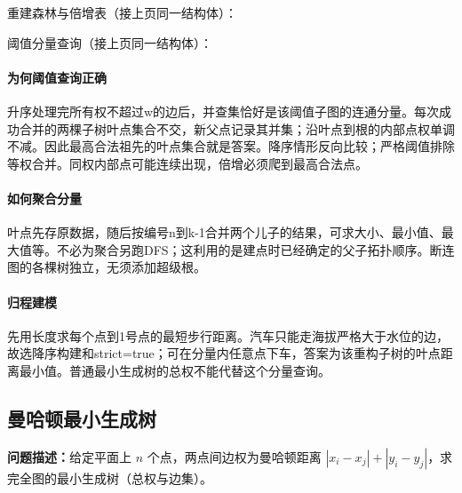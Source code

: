 \Needspace{387pt}



\newpage

\noindent 重建森林与倍增表（接上页同一结构体）：



\newpage

\noindent 阈值分量查询（接上页同一结构体）：



\paragraph{为何阈值查询正确} 升序处理完所有权不超过w的边后，并查集恰好是该阈值子图的连通分量。每次成功合并的两棵子树叶点集合不交，新父点记录其并集；沿叶点到根的内部点权单调不减。因此最高合法祖先的叶点集合就是答案。降序情形反向比较；严格阈值排除等权合并。同权内部点可能连续出现，倍增必须爬到最高合法点。

\paragraph{如何聚合分量} 叶点先存原数据，随后按编号n到k-1合并两个儿子的结果，可求大小、最小值、最大值等。不必为聚合另跑DFS；这利用的是建点时已经确定的父子拓扑顺序。断连图的各棵树独立，无须添加超级根。

\paragraph{归程建模} 先用长度求每个点到1号点的最短步行距离。汽车只能走海拔严格大于水位的边，故选降序构建和strict=true；可在分量内任意点下车，答案为该重构子树的叶点距离最小值。普通最小生成树的总权不能代替这个分量查询。

\newpage

\Needspace{549pt}

\subsection{曼哈顿最小生成树}\label{compact-ManhattanMST}

\noindent\textbf{问题描述：}\allowbreak 给定平面上 $n$ 个点，两点间边权为曼哈顿距离 $|x_i-x_j|+|y_i-y_j|$，求完全图的最小生成树（总权与边集）。

